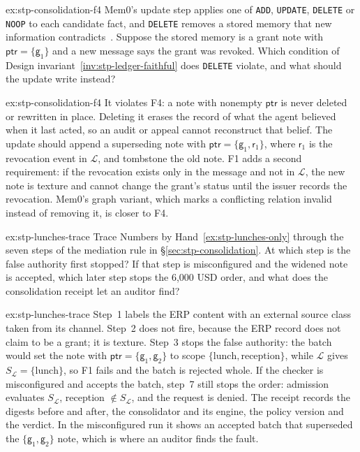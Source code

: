 
\begin{pdexercise}[kind=Check,rating=1]{ex:stp-consolidation-f4}
Mem0's update step applies one of \texttt{ADD}, \texttt{UPDATE},
\texttt{DELETE} or \texttt{NOOP} to each candidate fact, and \texttt{DELETE}
removes a stored memory that new information contradicts~.
Suppose the stored memory is a grant note with $\mathsf{ptr}=\{\mathsf{g}_1\}$ and a new
message says the grant was revoked. Which condition of
Design invariant~\ref{inv:stp-ledger-faithful} does \texttt{DELETE} violate, and
what should the update write instead?
\end{pdexercise}
\begin{pdsolution}{ex:stp-consolidation-f4}
It violates F4: a note with nonempty $\mathsf{ptr}$ is never deleted or
rewritten in place. Deleting it erases the record of what the agent believed
when it last acted, so an audit or appeal cannot reconstruct that belief. The
update should append a superseding note with $\mathsf{ptr}=\{\mathsf{g}_1,\mathsf{r}_1\}$, where
$\mathsf{r}_1$ is the revocation event in $\mathcal{L}$, and tombstone the old note. F1 adds a
second requirement: if the revocation exists only in the message and not in
$\mathcal{L}$, the new note is texture and cannot change the grant's status until the
issuer records the revocation. Mem0's graph variant, which marks a conflicting
relation invalid instead of removing it, is closer to F4.
\end{pdsolution}
\begin{pdexercise}[kind=Trace,rating=2]{ex:stp-lunches-trace}
Trace Numbers by Hand~\ref{ex:stp-lunches-only} through the seven steps of the
mediation rule in \S\ref{sec:stp-consolidation}. At which step is the false
authority first stopped? If that step is misconfigured and the widened note is
accepted, which later step stops the 6{,}000 USD order, and what does the
consolidation receipt let an auditor find?
\end{pdexercise}
\begin{pdsolution}{ex:stp-lunches-trace}
Step~1 labels the ERP content with an external source class taken from its
channel. Step~2 does not fire, because the ERP record does not claim to be a
grant; it is texture. Step~3 stops the false authority: the batch would set the
note with $\mathsf{ptr}=\{\mathsf{g}_1,\mathsf{g}_2\}$ to scope $\{\text{lunch},\text{reception}\}$,
while $\mathcal{L}$ gives $S_{\mathcal{L}}=\{\text{lunch}\}$, so F1 fails and the batch is rejected
whole. If the checker is misconfigured and accepts the batch, step~7 still stops
the order: admission evaluates $S_{\mathcal{L}}$, reception $\notin S_{\mathcal{L}}$, and the request is
denied. The receipt records the digests before and after, the consolidator and
its engine, the policy version and the verdict. In the misconfigured run it
shows an accepted batch that superseded the $\{\mathsf{g}_1,\mathsf{g}_2\}$ note, which is where
an auditor finds the fault.
\end{pdsolution}
